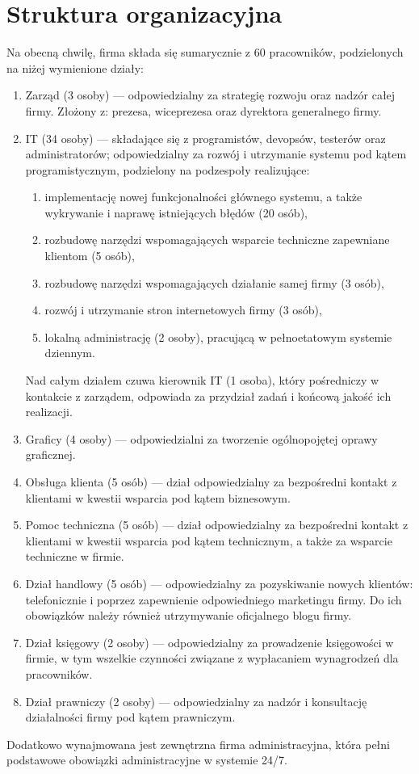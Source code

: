 \documentclass{article}
\begin{document}
    \section{Struktura organizacyjna}
        Na obecną chwilę, firma składa się sumarycznie z 60 pracowników, podzielonych na niżej wymienione działy:
        \begin{enumerate}
            \item Zarząd (3 osoby) --- odpowiedzialny za strategię rozwoju oraz nadzór całej firmy. Złożony z: prezesa, wiceprezesa oraz dyrektora generalnego firmy.
            \item IT (34 osoby) --- składające się z programistów, devopsów, testerów oraz administratorów; odpowiedzialny za rozwój i utrzymanie systemu pod kątem programistycznym, podzielony na podzespoły realizujące:
            \begin{enumerate}
                \item implementację nowej funkcjonalności głównego systemu, a także wykrywanie i naprawę istniejących błędów (20 osób),
                \item rozbudowę narzędzi wspomagających wsparcie techniczne zapewniane klientom (5 osób),
                \item rozbudowę narzędzi wspomagających działanie samej firmy (3 osób),
                \item rozwój i utrzymanie stron internetowych firmy (3 osób),
                \item lokalną administrację (2 osoby), pracującą w pełnoetatowym systemie dziennym.
            \end{enumerate}
            Nad całym działem czuwa kierownik IT (1 osoba), który pośredniczy w kontakcie z zarządem, odpowiada za przydział zadań i końcową jakość ich realizacji.
            \item Graficy (4 osoby) --- odpowiedzialni za tworzenie ogólnopojętej oprawy graficznej.
            \item Obsługa klienta (5 osób) --- dział odpowiedzialny za bezpośredni kontakt z klientami w kwestii wsparcia pod kątem biznesowym.
            \item Pomoc techniczna (5 osób) --- dział odpowiedzialny za bezpośredni kontakt z klientami w kwestii wsparcia pod kątem technicznym, a także za wsparcie techniczne w firmie.
            \item Dział handlowy (5 osób) --- odpowiedzialny za pozyskiwanie nowych klientów: telefonicznie i poprzez zapewnienie odpowiedniego marketingu firmy. Do ich obowiązków należy również utrzymywanie oficjalnego blogu firmy.
            \item Dział księgowy (2 osoby) --- odpowiedzialny za prowadzenie księgowości w firmie, w tym wszelkie czynności związane z wypłacaniem wynagrodzeń dla pracowników.
            \item Dział prawniczy (2 osoby) --- odpowiedzialny za nadzór i konsultację działalności firmy pod kątem prawniczym.
        \end{enumerate}
        Dodatkowo wynajmowana jest zewnętrzna firma administracyjna, która pełni podstawowe obowiązki administracyjne w systemie 24/7.
\end{document}
